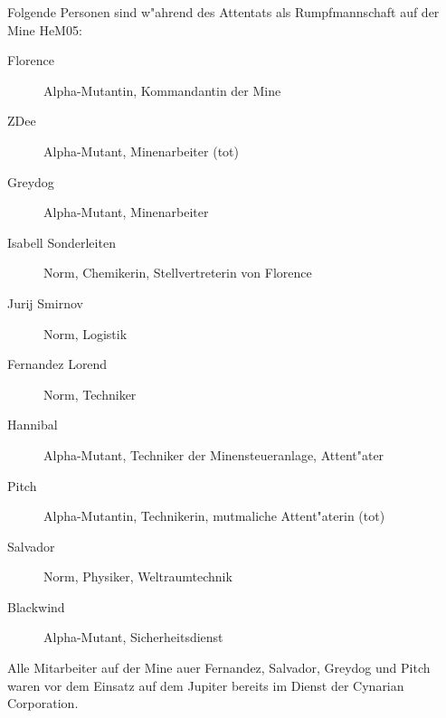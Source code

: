 
Folgende Personen sind w"ahrend des Attentats als Rumpfmannschaft auf der Mine HeM05:

\begin{description}
    \item[Florence] Alpha-Mutantin, Kommandantin der Mine    
    \item[ZDee] Alpha-Mutant, Minenarbeiter (tot)
    \item[Greydog] Alpha-Mutant, Minenarbeiter
    \item[Isabell Sonderleiten] Norm, Chemikerin, Stellvertreterin von Florence
    \item[Jurij Smirnov] Norm, Logistik
    \item[Fernandez Lorend] Norm, Techniker
    \item[Hannibal] Alpha-Mutant, Techniker der Minensteueranlage, Attent"ater
    \item[Pitch] Alpha-Mutantin, Technikerin, mutma\3liche Attent"aterin (tot)
    \item[Salvador] Norm, Physiker, Weltraumtechnik
    \item[Blackwind] Alpha-Mutant, Sicherheitsdienst
\end{description}

Alle Mitarbeiter auf der Mine au\3er Fernandez, Salvador, Greydog und Pitch waren vor dem Einsatz auf dem Jupiter bereits im Dienst der Cynarian Corporation.